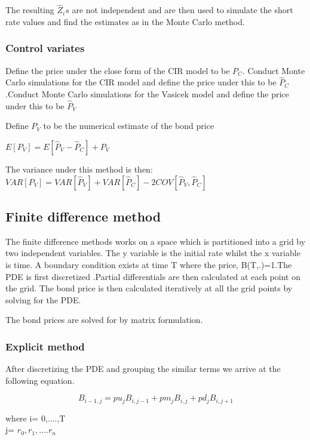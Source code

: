 \documentclass[12pt,a4paper]{article}
\begin{document}
The resulting $\hat{Z}_{i}s$ are not independent and are then used to simulate the short rate values and find the estimates as in the Monte Carlo method.   

 
\subsubsection{Control variates}

Define the price under the close form of the CIR model to be $P_{C}$. Conduct Monte Carlo simulations for the CIR model and define the price under this to be $\hat{P}_{C}$.Conduct Monte Carlo simulations for the Vasicek model and define the price under this to be $\hat{P}_{V}$

Define $P_{V}$ to be the numerical estimate of the bond price

$E[P_{V}]=E[\hat{P}_{V}-\hat{P}_{C}]+P_{V} $

The variance under this method is then:  
\\$VAR[P_{V}]=VAR[\hat{P}_{V}]+VAR[\hat{P}_{C}]-2COV[\hat{P}_{V},\hat{P}_{C}]$ 


    
\subsection{Finite difference method}

The finite difference methods works on a space which is partitioned into a grid by two independent variables. The y variable is the initial rate whilst the x variable is time. A boundary condition exists at time T where the price, B(T,.)=1.The PDE is first discretized .Partial differentials are then calculated at each point on the grid. The bond price is then calculated iteratively at all the grid points by solving for the PDE.

The bond prices are solved for by matrix formulation.    


\subsubsection{Explicit method}

After discretizing the PDE and grouping the similar terms we arrive at the following equation.  

$$B_{i-1,j}=pu_{j}B_{i,j-1}+pm_{j}B_{i,j}+pd_{j}B_{i,j+1}$$ 

where i= 0,....,T \\
      j= $r_0,r_1,....r_n$
      
\end{document}
